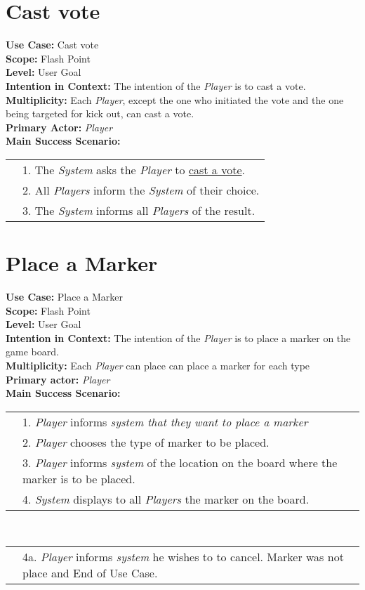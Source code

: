 \documentclass{article}
\begin{document}
	\section*{Cast vote}
	\textbf{Use Case:} Cast vote\\
	\textbf{Scope:} Flash Point\\
	\textbf{Level:} User Goal\\
	\textbf{Intention in Context:} The intention of the \textit{Player} is to cast a vote.\\
	\textbf{Multiplicity: }Each \textit{Player}, except the one who initiated the vote and the one being targeted for kick out, can cast a vote.\\
	\textbf{Primary Actor:} \textit{Player}\\
	\textbf{Main Success Scenario:}\\
	\begin{tabular}{l l}
		&1. The \textit{System} asks the \textit{Player} to \underline{cast a vote}.\\
		&2. All \textit{Players} inform the \textit{System} of their choice.\\
		&3. The \textit{System} informs all \textit{Players} of the result.
	\end{tabular}
	\section*{Place a Marker}
	\textbf{Use Case:} Place a Marker\\
	\textbf{Scope:} Flash Point\\
	\textbf{Level:} User Goal\\
	\textbf{Intention in Context:} The intention of the \textit{Player} is to place a marker on the game board.\\
	\textbf{Multiplicity: }Each \textit{Player} can place can place a marker for each type\\
	\textbf{Primary actor:} \textit{Player}\\
	\textbf{Main Success Scenario:}\\
	\begin{tabular}{l l}
		&1. \textit{Player} informs \textit{system that they want to place a marker}\\
		&2. \textit{Player} chooses the type of marker to be placed.\\
		&3. \textit{Player} informs \textit{system} of the location on the board where the marker is to be placed.\\
		&4. \textit{System} displays to all \textit{Players} the marker on the board.
	\end{tabular}\\
	\begin{tabular}{l l}
		
		&4a. \textit{Player} informs \textit{system} he wishes to to cancel. Marker was not place and End of Use Case.
	\end{tabular}
\end{document}
